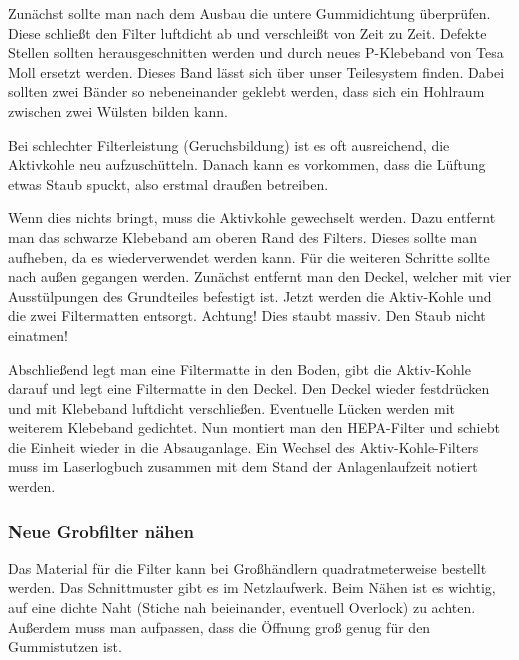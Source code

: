 \documentclass{\basedir/fablab-document}
\begin{document}
	Zunächst sollte man nach dem Ausbau die untere Gummidichtung überprüfen. Diese schließt den Filter luftdicht ab und verschleißt von Zeit zu Zeit. Defekte Stellen sollten herausgeschnitten werden und durch neues P-Klebeband von Tesa Moll ersetzt werden. Dieses Band lässt sich über unser Teilesystem finden. Dabei sollten zwei Bänder so nebeneinander geklebt werden, dass sich ein Hohlraum zwischen zwei Wülsten bilden kann.

	Bei schlechter Filterleistung (Geruchsbildung) ist es oft ausreichend, die Aktivkohle neu aufzuschütteln. Danach kann es vorkommen, dass die Lüftung etwas Staub spuckt, also erstmal draußen betreiben.

	Wenn dies nichts bringt, muss die Aktivkohle gewechselt werden. Dazu entfernt man das schwarze Klebeband am oberen Rand des Filters. Dieses sollte man aufheben, da es wiederverwendet werden kann. Für die weiteren Schritte sollte nach außen gegangen werden. Zunächst entfernt man den Deckel, welcher mit vier Ausstülpungen des Grundteiles befestigt ist. Jetzt werden die Aktiv-Kohle und die zwei Filtermatten entsorgt. Achtung! Dies staubt massiv. Den Staub nicht einatmen!

	Abschließend legt man eine Filtermatte in den Boden, gibt die Aktiv-Kohle darauf und legt eine Filtermatte in den Deckel. Den Deckel wieder festdrücken und mit Klebeband luftdicht verschließen. Eventuelle Lücken werden mit weiterem Klebeband gedichtet. Nun montiert man den HEPA-Filter und schiebt die Einheit wieder in die Absauganlage.
	Ein Wechsel des Aktiv-Kohle-Filters muss im Laserlogbuch zusammen mit dem Stand der Anlagenlaufzeit notiert werden.
	\subsubsection{Neue Grobfilter nähen}
	Das Material für die Filter kann bei Großhändlern quadratmeterweise bestellt werden. Das Schnittmuster gibt es im Netzlaufwerk. Beim Nähen ist es wichtig, auf eine dichte Naht (Stiche nah beieinander, eventuell Overlock) zu achten. Außerdem muss man aufpassen, dass die Öffnung groß genug für den Gummistutzen ist.
\end{document}
